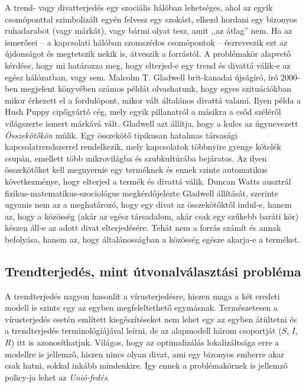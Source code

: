   A trend- vagy divatterjedés egy szociális hálóban lehetséges, ahol az egyik csomóponttal szimbolizált egyén felvesz egy szokást, elkezd hordani egy bizonyos ruhadarabot (vagy márkát), vagy bármi olyat tesz, amit ,,az átlag'' nem. Ha az ismerősei -- a kapcsolati hálóban szomszédos csomópontok -- észreveszik ezt az újdonságot és megtetszik nekik is, átveszik a forrástól. A problémakör alapvető kérdése, hogy mi határozza meg, hogy elterjed-e egy trend és divattá válik-e az egész hálózatban, vagy sem. Malcolm T. Gladwell brit-kanadai újságíró, író 2000-ben megjelent könyvében \cite{The_Tipping_Point} számos példát olvashatunk, hogy egyes szituációkban mikor érkezett el a fordulópont, mikor vált általános divattá valami. Ilyen példa a Hush Puppy cipőgyártó cég, mely egyik pillanatról a másikra a csőd széléről világszerte ismert márkává vált. Gladwell azt állítja, hogy a kulcs az úgynevezett \textit{Összekötőkön} múlik. Egy összekötő tipikusan hatalmas társasági kapcsolatrendszerrel rendelkezik, mely kapcsolatok többnyire gyenge kötelék csupán, emellett több mikrovilágba és szubkultúrába bejáratos. Az ilyen összekötőket kell megnyernie egy terméknek és ennek szinte automatikus következménye, hogy elterjed a termék és divattá válik. Duncan Watts ausztrál fizikus-matematikus-szociológus megkérdőjelezte Gladwell állítását, szerinte ugyanis nem az a meghatározó, hogy egy divat az összekötőktől indul-e, hanem az, hogy a közösség (akár az egész társadalom, akár csak egy szűkebb baráti kör) készen áll-e az adott divat elterjedésére. Tehát nem a forrás számít és annak befolyása, hanem az, hogy általánosságban a közösség egésze akarja-e a terméket.\\

    \subsection{Trendterjedés, mint útvonalválasztási probléma}

    A trendterjedés nagyon hasonlít a vírusterjedésre, hiszen maga a két eredeti modell is szinte egy az egyben megfeleltethető egymásnak. Természetesen a vírusterjedés esetén említett kiegészítéseket nem lehet egy az egyben átültetni és a trendterjedés terminológiájával leírni, de az alapmodell három csoportját ($S$, $I$, $R$) itt is azonosíthatjuk. Világos, hogy az optimalizálás lokalizáltsága erre a modellre is jellemző, hiszen nincs olyan divat, ami egy bizonyos emberre akar csak hatni, sokkal inkább mindenkire. Így ennek a problémakörnek is jellemző policy-ja lehet az \textit{Unió-fedés}.

